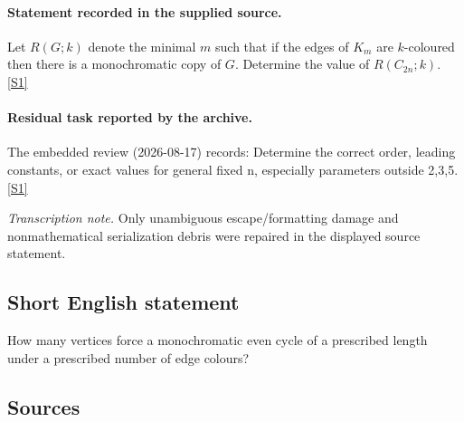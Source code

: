 \documentclass[11pt,a4paper]{article}
\newcommand{\sref}[2]{\hyperlink{source:#1:#2}{[S#2]}}
\begin{document}
\paragraph{Statement recorded in the supplied source.}
Let $R(G;k)$ denote the minimal $m$ such that if the edges of $K_m$ are $k$-coloured then there is a monochromatic copy of $G$. Determine the value of $ R(C_{2n};k). $ \sref{2174}{1}

\paragraph{Residual task reported by the archive.}

The embedded review (2026-08-17) records: Determine the correct order, leading constants, or exact values for general fixed n, especially parameters outside {2,3,5}. \sref{2174}{1}

{\small\emph{Transcription note.} Only unambiguous escape/formatting damage and nonmathematical serialization debris were repaired in the displayed source statement.}

\subsection{Short English statement}

How many vertices force a monochromatic even cycle of a prescribed length under a prescribed number of edge colours?

\subsection{Sources}
\end{document}
